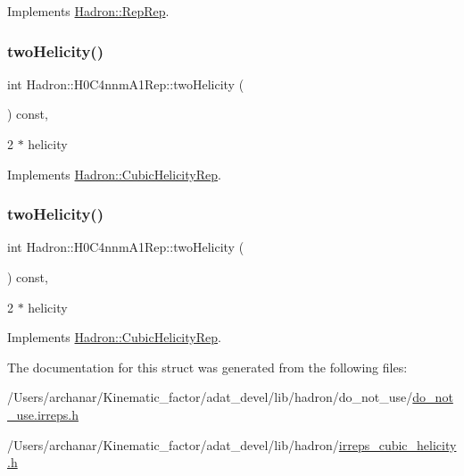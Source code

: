 Implements \mbox{\hyperlink{structHadron_1_1RepRep_ab3213025f6de249f7095892109575fde}{Hadron\+::\+Rep\+Rep}}.

\mbox{\label{structHadron_1_1H0C4nnmA1Rep_a53bf7b92886bd139cfbc1cb86f44aa28}} 
\subsubsection{\texorpdfstring{twoHelicity()}{twoHelicity()}\hspace{0.1cm}{\footnotesize\ttfamily [1/2]}}
{\footnotesize\ttfamily int Hadron\+::\+H0\+C4nnm\+A1\+Rep\+::two\+Helicity (\begin{DoxyParamCaption}{ }\end{DoxyParamCaption}) const\hspace{0.3cm}{\ttfamily [inline]}, {\ttfamily [virtual]}}

2 $\ast$ helicity 

Implements \mbox{\hyperlink{structHadron_1_1CubicHelicityRep_af507aa56fc2747eacc8cb6c96db31ecc}{Hadron\+::\+Cubic\+Helicity\+Rep}}.

\mbox{\label{structHadron_1_1H0C4nnmA1Rep_a53bf7b92886bd139cfbc1cb86f44aa28}} 
\subsubsection{\texorpdfstring{twoHelicity()}{twoHelicity()}\hspace{0.1cm}{\footnotesize\ttfamily [2/2]}}
{\footnotesize\ttfamily int Hadron\+::\+H0\+C4nnm\+A1\+Rep\+::two\+Helicity (\begin{DoxyParamCaption}{ }\end{DoxyParamCaption}) const\hspace{0.3cm}{\ttfamily [inline]}, {\ttfamily [virtual]}}

2 $\ast$ helicity 

Implements \mbox{\hyperlink{structHadron_1_1CubicHelicityRep_af507aa56fc2747eacc8cb6c96db31ecc}{Hadron\+::\+Cubic\+Helicity\+Rep}}.



The documentation for this struct was generated from the following files\+:\begin{DoxyCompactItemize}
\item 
/\+Users/archanar/\+Kinematic\+\_\+factor/adat\+\_\+devel/lib/hadron/do\+\_\+not\+\_\+use/\mbox{\hyperlink{do__not__use_8irreps_8h}{do\+\_\+not\+\_\+use.\+irreps.\+h}}\item 
/\+Users/archanar/\+Kinematic\+\_\+factor/adat\+\_\+devel/lib/hadron/\mbox{\hyperlink{lib_2hadron_2irreps__cubic__helicity_8h}{irreps\+\_\+cubic\+\_\+helicity.\+h}}\end{DoxyCompactItemize}
